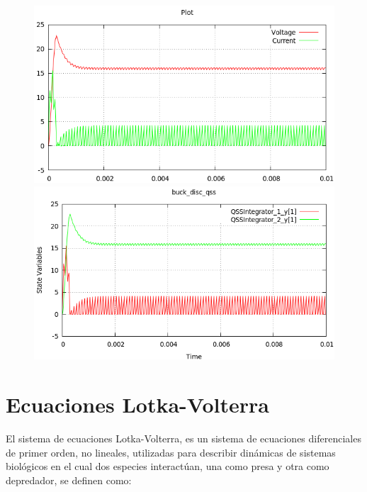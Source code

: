 \begin{figure}[H]
\centering
\begin{minipage}{0.5\textwidth}
\centering
 \includegraphics[width=\linewidth]{buck_disk-pd}
\end{minipage}\hfill
\begin{minipage}{0.5\textwidth}
\centering
 \includegraphics[width=\linewidth]{buck_disk-qss}
\end{minipage}
\end{figure}

\section{Ecuaciones Lotka-Volterra}

	El sistema de ecuaciones Lotka-Volterra, es un sistema de ecuaciones diferenciales de primer orden, no lineales, utilizadas para describir dinámicas de sistemas biológicos en el cual dos especies interactúan, una como presa y otra como depredador, se definen como:

